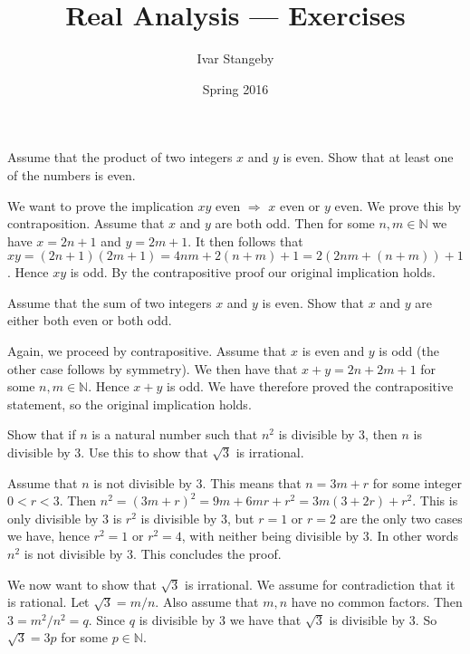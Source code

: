 \documentclass{homework}
\author{Ivar Stangeby}
\title{Real Analysis --- Exercises}
\date{Spring 2016}
\begin{document}

\begin{problemtext}
Assume that the product of two integers $x$ and $y$ is even. Show that at least
one of the numbers is even.
\end{problemtext} 
\begin{solution}
We want to prove the implication $xy$ even $\Longrightarrow$ $x$ even or $y$
even. We prove this by contraposition. Assume that $x$ and $y$ are both odd.
Then for some $n, m \in \mathbb{N}$ we have $x = 2n + 1$ and $y = 2m+1$.  It
then follows that $xy = \left(2n + 1\right)\left(2m + 1\right) = 4nm + 2(n + m)
+ 1 = 2(2nm + (n + m)) + 1$. Hence $xy$ is odd. By the contrapositive proof our
original implication holds.
\end{solution}

\begin{problemtext}
   Assume that the sum of two integers  $x$ and $y$ is even. Show that $x$ and
   $y$ are either both even or both odd.
\end{problemtext}
\begin{solution}
    Again, we proceed by contrapositive. Assume that $x$ is even and $y$ is odd
    (the other case follows by symmetry). We then have that $x +  y = 2n + 2m +
    1$ for some $n, m \in \mathbb{N}$. Hence $x + y$ is odd. We have therefore
    proved the contrapositive statement, so the original implication holds.
\end{solution}

\begin{problemtext}
    Show that if $n$ is a natural number such that $n^2$ is divisible by 3,
    then $n$ is divisible by 3. Use this to show that $\sqrt{3}$ is irrational.
\end{problemtext}
\begin{solution}
    Assume that $n$ is not divisible by $3$. This means that $n = 3m + r$ for
    some integer $0 < r < 3$.  Then $n^2 = (3m + r)^2 = 9m + 6mr + r^2 = 3m(3 +
    2r) + r^2$. This is only divisible by $3$ is $r^2$ is divisible by $3$, but
    $r = 1$ or $r = 2$ are the only two cases we have, hence $r^2 = 1$ or $r^2
    = 4$, with neither being divisible by 3. In other words $n^2$ is not
    divisible by 3. This concludes the proof.

    We now want to show that $\sqrt{3}$ is irrational. We assume for
    contradiction that it is rational. Let $\sqrt{3} = m / n$. Also assume that
    $m, n$ have no common factors. Then $3 = m^2 / n^2 = q$. Since $q$ is
    divisible by $3$ we have that $\sqrt{3}$ is divisible by 3. So $\sqrt{3} =
    3p$ for some $p \in \mathbb{N}$. 
\end{solution}
\end{document}
